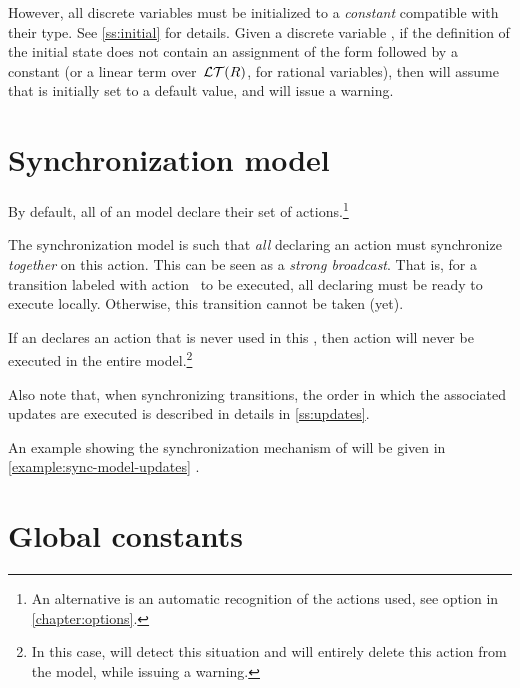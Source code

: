 However, all discrete variables must be initialized to a \emph{constant} compatible with their type.
See \cref{ss:initial} for details.
Given a discrete variable , if the definition of the initial state does not contain an assignment of the form  followed by a constant (or a linear term over~$\mathcal{LT}(R)$, for rational variables), then \imitator{} will assume that  is initially set to a default value, and will issue a warning.



\section{Synchronization model}\label{sect:synchronization}

By default, all \IPTA{} of an \imitator{} model declare their set of actions.\footnote{%
	An alternative is an automatic recognition of the actions used, see option  in \cref{chapter:options}.
}

The \imitator{} synchronization model is such that \emph{all} \IPTA{} declaring an action must synchronize \emph{together} on this action.
This can be seen as a \emph{strong broadcast}.
That is, for a transition labeled with action~ to be executed, all \IPTA{} declaring  must be ready to execute  locally.
Otherwise, this transition cannot be taken (yet).

If an \IPTA{} declares an action  that is never used in this \IPTA{}, then action  will never be executed in the entire model.\footnote{%
	In this case, \imitator{} will detect this situation and will entirely delete this action from the model, while issuing a warning.
}

Also note that, when synchronizing transitions, the order in which the associated updates are executed is described in details in \cref{ss:updates}.

An example showing the synchronization mechanism of \imitator{} will be given in \cref{example:sync-model-updates} \pageref{example:sync-model-updates}.


\section{Global constants}

